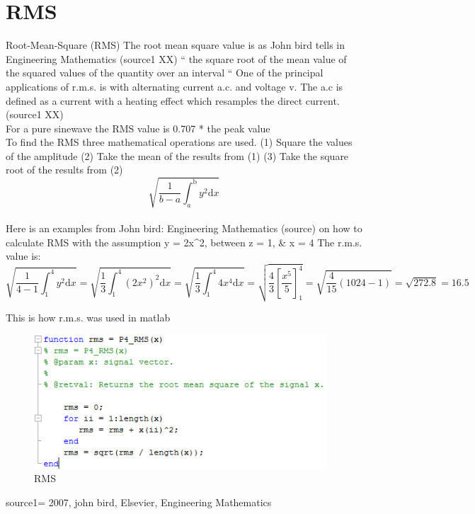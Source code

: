 \section{RMS}

Root-Mean-Square (RMS)
The root mean square value is as John bird tells in Engineering Mathematics (source1 XX) “ the square root of the mean value of the squared values of the quantity over an interval “
One of the principal applications of r.m.s. is with alternating current a.c. and voltage v. The a.c is defined as a current with a heating effect which resamples the direct current. (source1 XX)
\\
For a pure sinewave the RMS value is 0.707 * the peak value
\\
To find the RMS three mathematical operations are used.
(1)	Square the values of the amplitude
(2)	Take the mean of the results from (1)
(3)	Take the square root of the results from (2)
\begin{equation}\label{eq:RMS formular}
\sqrt{\frac{1}{b-a} \int_a^\mathrm{b}y^2\mathrm{d}x}
\end{equation}
\\
Here is an examples from John bird: Engineering Mathematics (source) on how to calculate RMS with the assumption y = 2x^2, between z = 1, & x = 4
The r.m.s. value is:
\\
\begin{equation}\label{eq:RMS formular}
\sqrt{\frac{1}{4-1} \int_1^\mathrm{4}y^2\mathrm{d}x} =
\sqrt{\frac{1}{3} \int_1^\mathrm{4}(2x^2)^2\mathrm{d}x} = 
\sqrt{\frac{1}{3} \int_1^\mathrm{4}4x^4\mathrm{d}x} = 
\sqrt{\frac{4}{3} [\frac{x^5}{5}]_1^4} =
\sqrt{\frac{4}{15} (1024-1)} = 
\sqrt{272.8} = 16.5
\end{equation}

This is how r.m.s. was used in matlab
\begin{figure}
\begin{center}
\includegraphics[height=5cm]{fig/RMS_matlabCode.png}
\caption{RMS}
\end{center}
\end{figure}

source1= 2007, john bird, Elsevier, Engineering Mathematics
